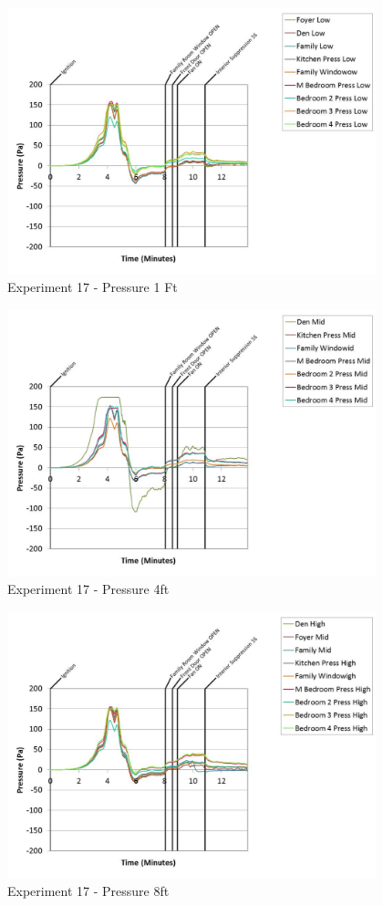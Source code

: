 \documentclass{article}
\begin{document}
\begin{appendices}
	\begin{figure}[h!]
		\centering
		\includegraphics[height=3.05in]{0_Images/Results_Charts/Exp_17_Charts/Pressure1Ft.pdf}
		\caption{Experiment 17 - Pressure 1 Ft}
	\end{figure}
 
	\clearpage

	\begin{figure}[h!]
		\centering
		\includegraphics[height=3.05in]{0_Images/Results_Charts/Exp_17_Charts/Pressure4ft.pdf}
		\caption{Experiment 17 - Pressure 4ft}
	\end{figure}
 

	\begin{figure}[h!]
		\centering
		\includegraphics[height=3.05in]{0_Images/Results_Charts/Exp_17_Charts/Pressure8ft.pdf}
		\caption{Experiment 17 - Pressure 8ft}
	\end{figure}
 

\end{appendices}
\end{document}
